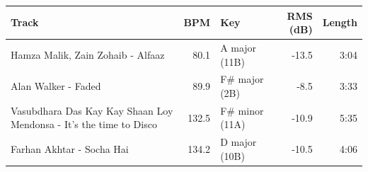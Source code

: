 \begin{tabularx}{\linewidth}{@{}Xrlrr@{}}\toprule
Track & BPM & Key & RMS (dB) & Length \\\midrule
Hamza Malik, Zain Zohaib - Alfaaz & 80.1 & A major (11B) & -13.5 & 3:04 \\
Alan Walker - Faded & 89.9 & F\# major (2B) & -8.5 & 3:33 \\
Vasubdhara Das Kay Kay Shaan Loy Mendonsa - It's the time to Disco & 132.5 & F\# minor (11A) & -10.9 & 5:35 \\
Farhan Akhtar - Socha Hai & 134.2 & D major (10B) & -10.5 & 4:06 \\
\bottomrule\end{tabularx}
